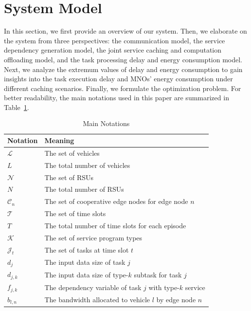 \documentclass[lettersize,journal]{IEEEtran}
\begin{document}
\section{System Model}
In this section, we first provide an overview of our system.  
Then, we elaborate on the system from three perspectives: the communication model, the service dependency generation model, the joint service caching and computation offloading model, and the task processing delay and energy consumption model.  
Next, we analyze the extremum values of delay and energy consumption to gain insights into the task execution delay and MNOs' energy consumption under different caching scenarios.  
Finally, we formulate the optimization problem. For better readability, the main notations used in this paper are summarized in Table~\ref{tab: notations}.
\begin{table}
	\caption{Main Notations}
	\label{tab: notations}
	\begin{center}
	\begin{tabularx}{\linewidth}{p{1.8cm} X}
	\hline
	\textbf{Notation} & \textbf{Meaning}  	\\ \hline
	$ \mathcal{L} $ 			& The set of vehicles   								\\
	$ L $ 						& The total number of vehicles   						\\	
	$ \mathcal{N} $ 			& The set of RSUs  										\\	
	$ N $ 						& The total number of RSUs  						\\	
	$ \mathcal{C}_{n} $			& The set of cooperative edge nodes for edge node $ n $  \\	
	$ \mathcal{T} $				& The set of time slots		   							 \\
	$ T $						& The total number of time slots for each episode					 \\		
	$ \mathcal{K} $				& The set of service program types	    			\\	
	$ \mathcal{J}_t $			& The set of tasks  at time slot $ t $	    			\\
	$ d_j $						& The input data size of task  $ j $	   		 \\	
	$ d_{j,k} $				& The input data size of type-$ k $ subtask for task $ j $ \\
	$ f_{j,k} $				& The dependency variable of task $j $ with  type-$ k $  service
	\\	
	$ b_{l,n} $				& The bandwidth allocated to vehicle $ l $ by edge node $ n $ 																					\\	

\end{tabularx}
\end{center}
\end{table}
\end{document}
